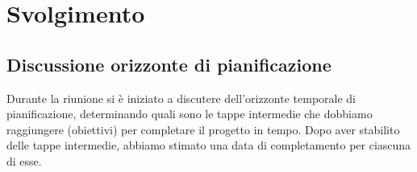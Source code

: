 \section{Svolgimento}

\subsection{Discussione orizzonte di pianificazione}
Durante la riunione si è iniziato a discutere dell'orizzonte temporale di pianificazione, determinando quali sono le tappe intermedie che dobbiamo raggiungere (obiettivi) per completare il progetto in tempo. Dopo aver stabilito delle tappe intermedie, abbiamo stimato una data di completamento per ciascuna di esse.